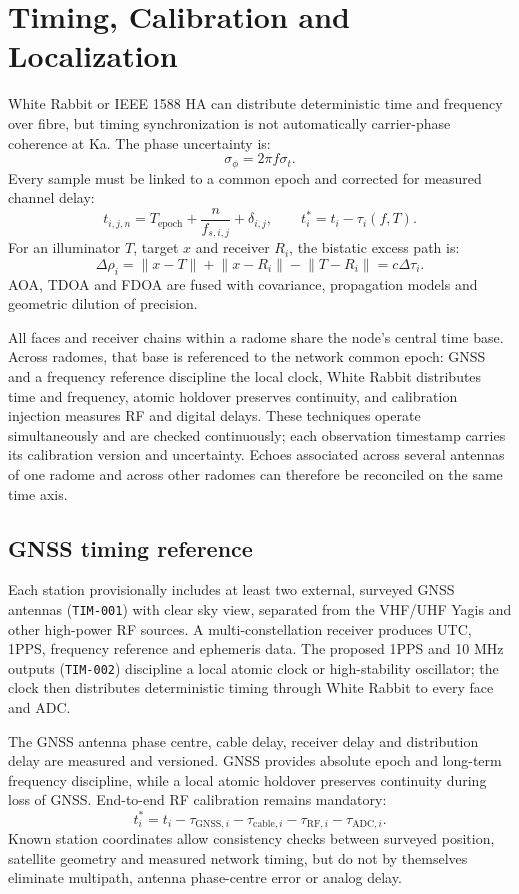 \chapter{Timing, Calibration and Localization}

White Rabbit or IEEE 1588 HA can distribute deterministic time and frequency over fibre, but timing synchronization is not automatically carrier-phase coherence at Ka. The phase uncertainty is:
\[
\sigma_\phi=2\pi f\sigma_t.
\]
Every sample must be linked to a common epoch and corrected for measured channel delay:
\[
t_{i,j,n}=T_{\mathrm{epoch}}+\frac{n}{f_{s,i,j}}+\delta_{i,j},\qquad t_i^\ast=t_i-\tau_i(f,T).
\]
For an illuminator $T$, target $x$ and receiver $R_i$, the bistatic excess path is:
\[
\Delta\rho_i=\lVert x-T\rVert+\lVert x-R_i\rVert-\lVert T-R_i\rVert=c\Delta\tau_i.
\]
AOA, TDOA and FDOA are fused with covariance, propagation models and geometric dilution of precision.

All faces and receiver chains within a radome share the node's central time base. Across radomes, that base is referenced to the network common epoch: GNSS and a frequency reference discipline the local clock, White Rabbit distributes time and frequency, atomic holdover preserves continuity, and calibration injection measures RF and digital delays. These techniques operate simultaneously and are checked continuously; each observation timestamp carries its calibration version and uncertainty. Echoes associated across several antennas of one radome and across other radomes can therefore be reconciled on the same time axis.

\section{GNSS timing reference}
Each station provisionally includes at least two external, surveyed GNSS antennas (\texttt{TIM-001}) with clear sky view, separated from the VHF/UHF Yagis and other high-power RF sources. A multi-constellation receiver produces UTC, 1PPS, frequency reference and ephemeris data. The proposed 1PPS and 10 MHz outputs (\texttt{TIM-002}) discipline a local atomic clock or high-stability oscillator; the clock then distributes deterministic timing through White Rabbit to every face and ADC.

The GNSS antenna phase centre, cable delay, receiver delay and distribution delay are measured and versioned. GNSS provides absolute epoch and long-term frequency discipline, while a local atomic holdover preserves continuity during loss of GNSS. End-to-end RF calibration remains mandatory:
\[
t_i^\ast=t_i-\tau_{\mathrm{GNSS},i}-\tau_{\mathrm{cable},i}-\tau_{\mathrm{RF},i}-\tau_{\mathrm{ADC},i}.
\]
Known station coordinates allow consistency checks between surveyed position, satellite geometry and measured network timing, but do not by themselves eliminate multipath, antenna phase-centre error or analog delay.

